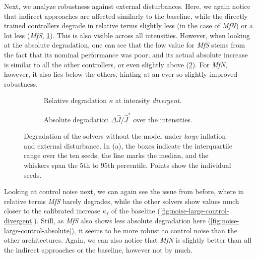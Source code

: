 Next, we analyze robustness against external disturbances. Here, we again notice that indirect
approaches are affected similarly to the baseline, while the directly trained controllers
degrade in relative terms slightly less (in the case of \emph{MfN}) or a lot less (\emph{MfS},
\cref{fig:noise-large-disturbance-divergent}). This is also visible
across all intensities. However, when looking at the absolute degradation, one can see that the low value for
\emph{MfS} stems from the fact that its nominal performance was poor, and its actual absolute increase is similar
to all the other controllers, or even slightly above (\cref{fig:noise-large-disturbance-absolute}). For \emph{MfN},
however, it also lies below the others, hinting at an ever so slightly improved robustness.

\begin{figure}[htbp]
  \centering
  \begin{subfigure}[t]{0.49\linewidth}
    \centering
    \caption{Relative degradation $\kappa$ at intensity \emph{divergent}.}
    \label{fig:noise-large-disturbance-divergent}
  \end{subfigure}\hfill
  \begin{subfigure}[t]{0.49\linewidth}
    \centering
    \caption{Absolute degradation $\Delta \hat{J} / \hat{J}^{*}$ over the intensities.}
    \label{fig:noise-large-disturbance-absolute}
  \end{subfigure}
  \caption{Degradation of the solvers without the model under \emph{large} inflation and external disturbance. In (a), the
  boxes indicate the interquartile range over the ten seeds, the line marks the median, and the whiskers span the $5$th to
  $95$th percentile. Points show the individual seeds.}
  \label{fig:noise-large-disturbance}
\end{figure}

Looking at control noise next, we can again see the issue from before, where in relative terms \emph{MfS} barely
degrades, while the other solvers show values much closer to the calibrated increase $\kappa_{\ell}$ of the baseline
(\cref{fig:noise-large-control-divergent}). Still, as \emph{MfS} also shows less absolute degradation here
(\cref{fig:noise-large-control-absolute}), it seems to be more robust to control noise than the
other architectures. Again, we can also notice that \emph{MfN} is slightly better than all the indirect approaches
or the baseline, however not by much.

